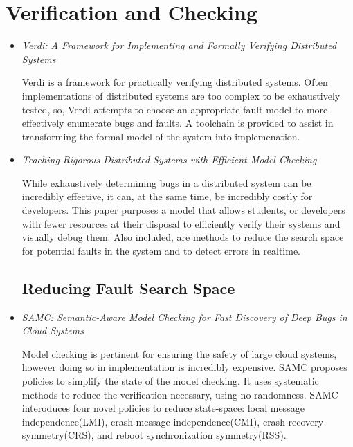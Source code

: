 \documentclass{article}
\begin{document}
\tableofcontents{}

\section{Verification and Checking}

\begin{itemize}
	\item
	\textit{Verdi: A Framework for Implementing and Formally Verifying Distributed Systems} \cite{Verdi}

	Verdi is a framework for practically verifying distributed systems. Often implementations of distributed systems are
	too complex to be exhaustively tested, so, Verdi attempts to choose an appropriate fault model to more effectively enumerate bugs and faults.
	A toolchain is provided to assist in transforming the formal model of the system into implemenation.

	\item
	\textit{Teaching Rigorous Distributed Systems with Efficient Model Checking} \cite{MichaelWAET2019}

	While exhaustively determining bugs in a distributed system can be incredibly effective, it can, at the same time, be incredibly costly for developers.
	This paper purposes a model that allows students, or developers with fewer resources at their disposal to efficiently verify their systems and visually debug them.
	Also included, are methods to reduce the search space for potential faults in the system and to detect errors in realtime.

	\subsection{Reducing Fault Search Space}

	\item
	\textit{SAMC: Semantic-Aware Model Checking for Fast Discovery of Deep Bugs in Cloud Systems} \cite{SAMC}

	Model checking is pertinent for ensuring the safety of large cloud systems, however doing so in implementation is incredibly expensive. SAMC proposes policies to simplify the state of the model checking.
	It uses systematic methods to reduce the verification necessary, using no randomness. 
	SAMC interoduces four novel policies to reduce state-space: local message independence(LMI), crash-message independence(CMI), crash recovery symmetry(CRS), and reboot synchronization symmetry(RSS).


\end{itemize}
\end{document}
